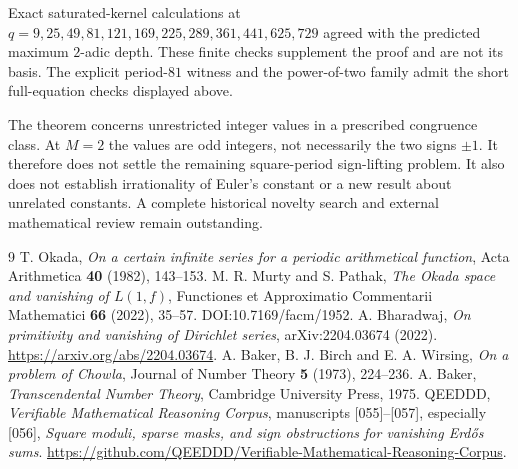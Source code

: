 \documentclass[11pt]{article}
\begin{document}
Exact saturated-kernel calculations at $q=9,25,49,81,121,169,225,289,361,441,625,729$ agreed with the predicted maximum $2$-adic depth. These finite checks supplement the proof and are not its basis. The explicit period-$81$ witness and the power-of-two family admit the short full-equation checks displayed above.

The theorem concerns unrestricted integer values in a prescribed congruence class. At $M=2$ the values are odd integers, not necessarily the two signs $\pm1$. It therefore does not settle the remaining square-period sign-lifting problem. It also does not establish irrationality of Euler's constant or a new result about unrelated constants. A complete historical novelty search and external mathematical review remain outstanding.

\begin{thebibliography}{9}
 T. Okada, \emph{On a certain infinite series for a periodic arithmetical function}, Acta Arithmetica \textbf{40} (1982), 143--153.
 M. R. Murty and S. Pathak, \emph{The Okada space and vanishing of $L(1,f)$}, Functiones et Approximatio Commentarii Mathematici \textbf{66} (2022), 35--57. DOI:10.7169/facm/1952.
 A. Bharadwaj, \emph{On primitivity and vanishing of Dirichlet series}, arXiv:2204.03674 (2022). \url{https://arxiv.org/abs/2204.03674}.
 A. Baker, B. J. Birch and E. A. Wirsing, \emph{On a problem of Chowla}, Journal of Number Theory \textbf{5} (1973), 224--236.
 A. Baker, \emph{Transcendental Number Theory}, Cambridge University Press, 1975.
 QEEDDD, \emph{Verifiable Mathematical Reasoning Corpus}, manuscripts [055]--[057], especially [056], \emph{Square moduli, sparse masks, and sign obstructions for vanishing Erd\H{o}s sums}. \url{https://github.com/QEEDDD/Verifiable-Mathematical-Reasoning-Corpus}.
\end{thebibliography}
\end{document}
